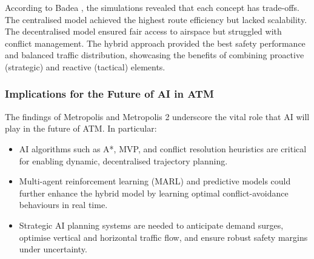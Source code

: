 According to Badea \cite{Badea_2022}, the simulations revealed that each concept has trade-offs. 
The centralised model achieved the highest route efficiency but lacked scalability. 
The decentralised model ensured fair access to airspace but struggled with conflict management. 
The hybrid approach provided the best safety performance and balanced traffic distribution, showcasing the benefits of combining proactive (strategic) and reactive (tactical) elements.


\subsubsection{Implications for the Future of AI in ATM}

The findings of Metropolis and Metropolis 2 underscore the vital role that \gls{AI} will play in the future of \gls{ATM}. 
In particular:
\begin{itemize}
    \item \Gls{AI} algorithms such as A*, \gls{MVP}, and conflict resolution heuristics are critical for enabling dynamic, decentralised trajectory planning.
    \item Multi-agent reinforcement learning (MARL) and predictive models could further enhance the hybrid model by learning optimal conflict-avoidance behaviours in real time.
    \item Strategic \gls{AI} planning systems are needed to anticipate demand surges, optimise vertical and horizontal traffic flow, and ensure robust safety margins under uncertainty.
\end{itemize}




